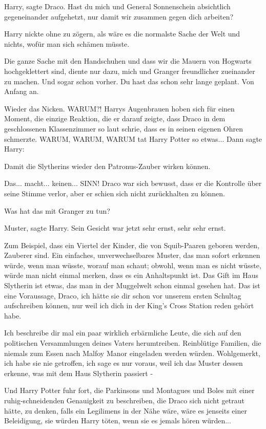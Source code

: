\glqq Harry\grqq{}, sagte Draco. \glqq Hast du mich und General Sonnenschein
absichtlich gegeneinander aufgehetzt, nur damit wir zusammen gegen dich
arbeiten?\grqq{}

Harry nickte ohne zu zögern, als wäre es die normalste Sache der Welt und
nichts, wofür man sich schämen müsste.

\glqq Die ganze Sache mit den Handschuhen und dass wir die Mauern von Hogwarts
hochgeklettert sind, diente nur dazu, mich und Granger freundlicher zueinander
zu machen. Und sogar schon vorher. Du hast das schon sehr lange geplant. Von
Anfang an.\grqq{}

Wieder das Nicken. \glqq WARUM?!\grqq{} Harrys Augenbrauen hoben sich für einen
Moment, die einzige Reaktion, die er darauf zeigte, dass Draco in dem
geschlossenen Klassenzimmer so laut schrie, dass es in seinen eigenen Ohren
schmerzte. WARUM, WARUM, WARUM tat Harry Potter so etwas... Dann sagte Harry:

\glqq Damit die Slytherins wieder den Patronus-Zauber wirken können.\grqq{}

\glqq Das... macht... keinen... SINN!\grqq{} Draco war sich bewusst, dass er die
Kontrolle über seine Stimme verlor, aber er schien sich nicht zurückhalten zu
können.

\glqq Was hat das mit Granger zu tun?\grqq{}

\glqq Muster\grqq{}, sagte Harry. Sein Gesicht war jetzt sehr ernst, sehr sehr
ernst.

\glqq Zum Beispiel, dass ein Viertel der Kinder, die von Squib-Paaren geboren
werden, Zauberer sind. Ein einfaches, unverwechselbares Muster, das man sofort
erkennen würde, wenn man wüsste, worauf man schaut; obwohl, wenn man es nicht
wüsste, würde man nicht einmal merken, dass es ein Anhaltspunkt ist. Das Gift im
Haus Slytherin ist etwas, das man in der Muggelwelt schon einmal gesehen hat.
Das ist eine Voraussage, Draco, ich hätte sie dir schon vor unserem ersten
Schultag aufschreiben können, nur weil ich dich in der King's Cross Station
reden gehört habe.

Ich beschreibe dir mal ein paar wirklich erbärmliche Leute, die sich auf den
politischen Versammlungen deines Vaters herumtreiben. Reinblütige Familien, die
niemals zum Essen nach Malfoy Manor eingeladen werden würden. Wohlgemerkt, ich
habe sie nie getroffen, ich sage es nur voraus, weil ich das Muster dessen
erkenne, was mit dem Haus Slytherin passiert -\grqq{}

Und Harry Potter fuhr fort, die Parkinsons und Montagues und Boles mit einer
ruhig-schneidenden Genauigkeit zu beschreiben, die Draco sich nicht getraut
hätte, zu denken, falls ein Legilimens in der Nähe wäre, wäre es jenseits einer
Beleidigung, sie würden Harry töten, wenn sie es jemals hören würden...

